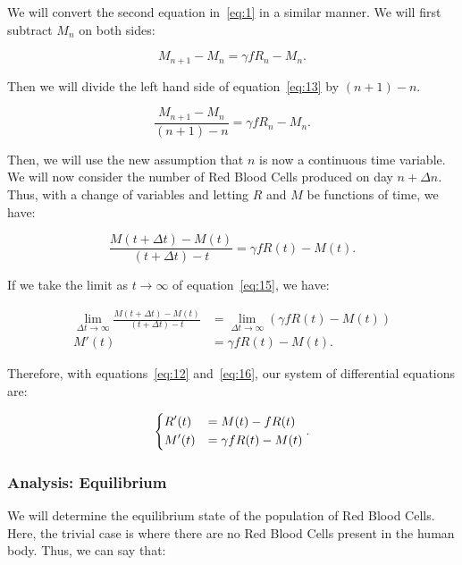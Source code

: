 We will convert the second equation in~\eqref{eq:1} in a similar manner. We will first subtract $M_n$ on both sides:

\begin{equation}
    M_{n+1} - M_n = \gamma fR_n - M_n.
    \label{eq:13}
\end{equation}

Then we will divide the left hand side of equation~\eqref{eq:13} by $(n+1)-n$.

\begin{equation}
    \frac{M_{n+1} - M_n}{(n+1)-n} = \gamma fR_n - M_n.
    \label{eq:14}
\end{equation}

Then, we will use the new assumption that $n$ is now a continuous time variable. We will now consider the number of Red Blood Cells produced on day $n+\Delta n$. Thus, with a change of variables and letting $R$ and $M$ be functions of time, we have:

\begin{equation}
    \frac{M(t+\Delta t) - M(t)}{(t+\Delta t)-t} = \gamma fR(t) - M(t).
    \label{eq:15}
\end{equation}

If we take the limit as $t\to\infty$ of equation~\eqref{eq:15}, we have:

\begin{align} 
    \lim_{\Delta t \to\infty}\frac{M(t+\Delta t) - M(t)}{(t+\Delta t)-t} &= \lim_{\Delta t \to\infty} (\gamma fR(t) - M(t)) \nonumber\\
    M'(t) &= \gamma fR(t) - M(t).\label{eq:16}
\end{align}

Therefore, with equations~\eqref{eq:12} and~\eqref{eq:16}, our system of differential equations are:

\begin{equation}
    \begin{dcases}
        R'(t) &= M(t) - fR(t)\\
        M'(t) &= \gamma fR(t) - M(t)
    \end{dcases}.
    \label{eq:17}
\end{equation}

\subsubsection{Analysis: Equilibrium}

We will determine the equilibrium state of the population of Red Blood Cells. Here, the trivial case is where there are no Red Blood Cells present in the human body. Thus, we can say that:

